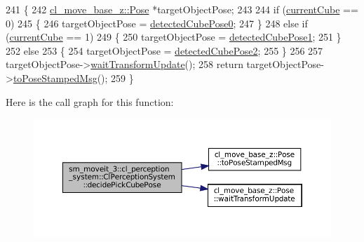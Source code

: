 \begin{DoxyCode}
241   \{
242     \hyperlink{classcl__move__base__z_1_1Pose}{cl\_move\_base\_z::Pose} *targetObjectPose;
243 
244     \textcolor{keywordflow}{if} (\hyperlink{classsm__moveit__3_1_1cl__perception__system_1_1ClPerceptionSystem_ad915fc687481d4157ec40de52f8eaa82}{currentCube} == 0)
245     \{
246       targetObjectPose = \hyperlink{classsm__moveit__3_1_1cl__perception__system_1_1ClPerceptionSystem_a6ac235df679beb12a5b5213bff957440}{detectedCubePose0};
247     \}
248     \textcolor{keywordflow}{else} \textcolor{keywordflow}{if} (\hyperlink{classsm__moveit__3_1_1cl__perception__system_1_1ClPerceptionSystem_ad915fc687481d4157ec40de52f8eaa82}{currentCube} == 1)
249     \{
250       targetObjectPose = \hyperlink{classsm__moveit__3_1_1cl__perception__system_1_1ClPerceptionSystem_a3f1b847b74fdd45ea377b626a7e8a295}{detectedCubePose1};
251     \}
252     \textcolor{keywordflow}{else}
253     \{
254       targetObjectPose = \hyperlink{classsm__moveit__3_1_1cl__perception__system_1_1ClPerceptionSystem_a2bda2a7e60579dd9d19c5b9e8a9dd79e}{detectedCubePose2};
255     \}
256 
257     targetObjectPose->\hyperlink{classcl__move__base__z_1_1Pose_a5f8576c3dacfb2f2e7f9df5105c480ea}{waitTransformUpdate}();
258     \textcolor{keywordflow}{return} targetObjectPose->\hyperlink{classcl__move__base__z_1_1Pose_a63887a88c1ac6e9a4a71b8d7d11aed6c}{toPoseStampedMsg}();
259   \}
\end{DoxyCode}
Here is the call graph for this function\+:
\nopagebreak
\begin{figure}[H]
\begin{center}
\leavevmode
\includegraphics[width=350pt]{classsm__moveit__3_1_1cl__perception__system_1_1ClPerceptionSystem_accc2813b1da308e9a71bec317db4590d_cgraph}
\end{center}
\end{figure}
\mbox{\label{classsm__moveit__3_1_1cl__perception__system_1_1ClPerceptionSystem_a0ee47269c0aacdced77b9bbe9577499d}} 

